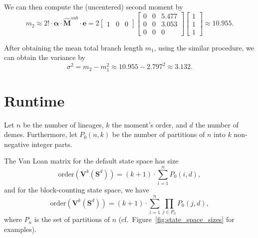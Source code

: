 \documentclass[hidelinks,11pt]{article}
\begin{document}
    We can then compute the (uncentered) second moment by
    \begin{equation*}
        m_2 \approx 2! \cdot \bm{\alpha} \cdot \hat{\mathbf{M}}^{sub}\cdot \mathbf{e} = 2 \left [
            \begin{array}{ccc}
                1 & 0 & 0
            \end{array}
            \right ] \left [
            \begin{array}{ccc}
                0 & 0 & 5.477 \\
                0 & 0 & 3.053 \\
                0 & 0 & 0
            \end{array}
            \right ] \left [
            \begin{array}{c}
                1 \\ 1 \\ 1
            \end{array}
            \right ] \approx 10.955.
    \end{equation*}

    After obtaining the mean total branch length $m_1$, using the similar procedure, we can obtain the variance by
    \begin{equation*}
        \sigma^2 = m_2 - m_1^2 \approx 10.955 - 2.797^2 \approx 3.132.
    \end{equation*}


    \section{Runtime}\label{sec:runtime}

    Let $n$ be the number of lineages, $k$ the moment's order, and $d$ the number of demes.
    Furthermore, let $P_0(n, k)$ be the number of partitions of $n$ into $k$ non-negative integer parts. %

    The Van Loan matrix for the default state space has size
    \begin{equation*}
        \text{order}(\mathbf{V}^k(\mathbf{S}^d)) = (k + 1) \cdot \sum_{i=1}^{n} P_0(i, d),
    \end{equation*}
    and for the block-counting state space, we have
    \begin{equation*}
        \text{order}(\mathbf{V}^k(\mathbf{S}^d)) = (k + 1) \cdot \sum_{i=1}^{n} \prod_{j \in P_n} P_0(j, d),
    \end{equation*}
    where $P_n$ is the set of partitions of $n$ (cf.\ Figure~\ref{fig:state_space_sizes} for examples).
\end{document}
